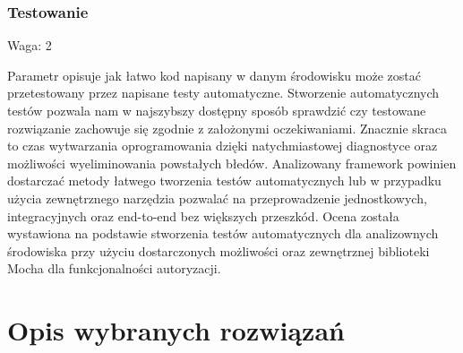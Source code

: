 \documentclass[12pt]{report}
\begin{document}
    \subsection{Testowanie}
      \begin{description}
        \item Waga: 2
      \end{description}
      Parametr opisuje jak łatwo kod napisany w danym środowisku może zostać przetestowany przez napisane testy automatyczne.
      Stworzenie automatycznych testów pozwala nam w najszybszy dostępny sposób sprawdzić czy testowane rozwiązanie zachowuje się zgodnie z założonymi oczekiwaniami.
      Znacznie skraca to czas wytwarzania oprogramowania dzięki natychmiastowej diagnostyce oraz możliwości wyeliminowania powstałych błedów.
      Analizowany framework powinien dostarczać metody łatwego tworzenia testów automatycznych lub w przypadku użycia zewnętrznego narzędzia pozwalać na przeprowadzenie jednostkowych, integracyjnych oraz end-to-end bez większych przeszkód.
      Ocena została wystawiona na podstawie stworzenia testów automatycznych dla analizownych środowiska przy użyciu dostarczonych możliwości oraz zewnętrznej biblioteki Mocha dla funkcjonalności autoryzacji.

\chapter{Opis wybranych rozwiązań}
\end{document}
